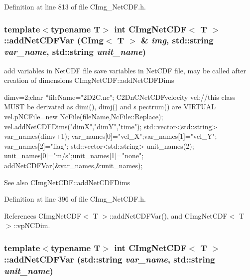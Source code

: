 Definition at line 813 of file CImg\_\-NetCDF.h.\hypertarget{classCImgNetCDF_a7435177fdb9af36ffc8f91460427f2eb}{
\subsubsection[{addNetCDFVar}]{\setlength{\rightskip}{0pt plus 5cm}template$<$typename T$>$ int {\bf CImgNetCDF}$<$ T $>$::addNetCDFVar (CImg$<$ T $>$ \& {\em img}, \/  std::string {\em var\_\-name}, \/  std::string {\em unit\_\-name})}}
\label{classCImgNetCDF_a7435177fdb9af36ffc8f91460427f2eb}


add variables in NetCDF file save variables in NetCDF file, may be called after creation of dimensions {\ttfamily CImgNetCDF::addNetCDFDims} 


\begin{DoxyCode}
   dimv=2;char *fileName="2D2C.nc";
   C2DnCNetCDFvelocity vel;//this class MUST be derivated as dimi(), dimj() and s
      pectrum() are VIRTUAL
   vel.pNCFile=new NcFile(fileName,NcFile::Replace);
   vel.addNetCDFDims("dimX","dimY","time");
   std::vector<std::string> var_names(dimv+1);
   var_names[0]="vel_X";var_names[1]="vel_Y";
   var_names[2]="flag";
   std::vector<std::string> unit_names(2);
   unit_names[0]="m/s";unit_names[1]="none";
   addNetCDFVar(&var_names,&unit_names);
\end{DoxyCode}


\begin{DoxySeeAlso}{See also}
CImgNetCDF::addNetCDFDims 
\end{DoxySeeAlso}


Definition at line 396 of file CImg\_\-NetCDF.h.

References CImgNetCDF$<$ T $>$::addNetCDFVar(), and CImgNetCDF$<$ T $>$::vpNCDim.\hypertarget{classCImgNetCDF_abae347b1449a8e6f65188ace2df5fee6}{
\subsubsection[{addNetCDFVar}]{\setlength{\rightskip}{0pt plus 5cm}template$<$typename T$>$ int {\bf CImgNetCDF}$<$ T $>$::addNetCDFVar (std::string {\em var\_\-name}, \/  std::string {\em unit\_\-name})}}
\label{classCImgNetCDF_abae347b1449a8e6f65188ace2df5fee6}


